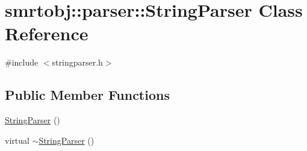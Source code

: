 \hypertarget{classsmrtobj_1_1parser_1_1_string_parser}{}\section{smrtobj\+:\+:parser\+:\+:String\+Parser Class Reference}
\label{classsmrtobj_1_1parser_1_1_string_parser}


{\ttfamily \#include $<$stringparser.\+h$>$}

\subsection*{Public Member Functions}
\begin{DoxyCompactItemize}
\item 
\hyperlink{classsmrtobj_1_1parser_1_1_string_parser_a855c13686d232d10fc7264fb4e13a2fb}{String\+Parser} ()
\item 
virtual \hyperlink{classsmrtobj_1_1parser_1_1_string_parser_ac62234192a7e3fa3041d0838f31b5d01}{$\sim$\+String\+Parser} ()
\end{DoxyCompactItemize}
